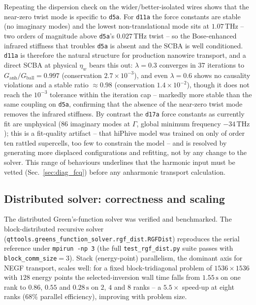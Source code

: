 Repeating the dispersion check on the wider/better-isolated wires shows that the near-zero
twist mode is specific to \texttt{d5a}. For \texttt{d11a} the force constants are stable
(no imaginary modes) and the lowest non-translational mode sits at $1.07\,\mathrm{THz}$ -- two
orders of magnitude above \texttt{d5a}'s $0.027\,\mathrm{THz}$ twist -- so the Bose-enhanced
infrared stiffness that troubles \texttt{d5a} is absent and the SCBA is well conditioned.
\texttt{d11a} is therefore the natural structure for production nanowire transport, and a
direct SCBA at physical $\eta_w$ bears this out: $\lambda=0.3$ converges in $37$ iterations to
$G_\text{anh}/G_\text{ball}=0.997$ (conservation $2.7\times10^{-3}$), and even $\lambda=0.6$
shows no causality violations and a stable ratio $\approx0.98$ (conservation
$1.4\times10^{-2}$), though it does not reach the $10^{-3}$ tolerance within the iteration cap --
markedly more stable than the same coupling on \texttt{d5a}, confirming that the absence of the
near-zero twist mode removes the infrared stiffness. By
contrast the \texttt{d17a} force constants as currently fit are unphysical (86 imaginary modes
at $\Gamma$, global minimum frequency $-34\,\mathrm{THz}$); this is a fit-quality artifact --
that hiPhive model was trained on only of order ten rattled supercells, too few to constrain
the model -- and is resolved by generating more displaced configurations and refitting, not by
any change to the solver. This range of behaviours underlines that the harmonic input must be
vetted (Sec.~\ref{sec:diag_fcq}) before any anharmonic transport calculation.

\subsection{Distributed solver: correctness and scaling}
\label{sec:diag_dist}

The distributed Green's-function solver was verified and benchmarked. The block-distributed
recursive solver (\texttt{qttools.greens\_function\_solver.rgf\_dist.RGFDist}) reproduces the
serial reference under \texttt{mpirun -np 3} (the full \texttt{test\_rgf\_dist.py} suite
passes with \texttt{block\_comm\_size}$=3$). Stack (energy-point) parallelism, the dominant
axis for NEGF transport, scales well: for a fixed block-tridiagonal problem of $1536\times1536$
with $128$ energy points the selected-inversion wall time falls from $1.55\,\mathrm{s}$ on one
rank to $0.86$, $0.55$ and $0.28\,\mathrm{s}$ on $2$, $4$ and $8$ ranks -- a $5.5\times$
speed-up at eight ranks ($68\%$ parallel efficiency), improving with problem size.

